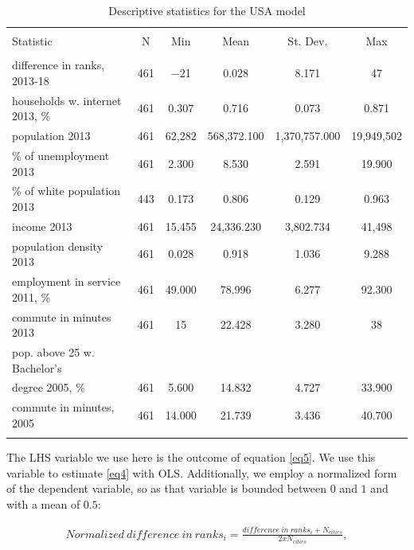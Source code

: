 \documentclass[10pt,letterpaper]{article}
\begin{document}
\begin{table}[!htbp] \centering 
  \caption{Descriptive statistics for the USA model\label{desc.usa}} 
  \label{} 
\small 
\begin{tabular}{@{\extracolsep{1pt}}lccccc} 
\\[-1.8ex]\hline 
\hline \\[-1.8ex] 
Statistic & \multicolumn{1}{c}{N} & \multicolumn{1}{c}{Min} & \multicolumn{1}{c}{Mean} & \multicolumn{1}{c}{St. Dev.} & \multicolumn{1}{c}{Max} \\ 
\hline \\[-1.8ex] 
difference in ranks, 2013-18 & 461 & $-$21 & 0.028 & 8.171 & 47 \\ 
households w. internet 2013, \% & 461 & 0.307 & 0.716 & 0.073 & 0.871 \\ 
population 2013 & 461 & 62,282 & 568,372.100 & 1,370,757.000 & 19,949,502 \\ 
\% of unemployment 2013 & 461 & 2.300 & 8.530 & 2.591 & 19.900 \\ 
\% of white population 2013 & 443 & 0.173 & 0.806 & 0.129 & 0.963 \\ 
income 2013 & 461 & 15,455 & 24,336.230 & 3,802.734 & 41,498 \\ 
population density 2013 & 461 & 0.028 & 0.918 & 1.036 & 9.288 \\ 
employment in service 2011, \% & 461 & 49.000 & 78.996 & 6.277 & 92.300 \\ 
commute in minutes 2013 & 461 & 15 & 22.428 & 3.280 & 38 \\ 
pop. above 25 w. Bachelor's \\
                             degree 2005, \% & 461 & 5.600 & 14.832 & 4.727 & 33.900 \\ 
commute in minutes, 2005 & 461 & 14.000 & 21.739 & 3.436 & 40.700 \\ 
\hline \\[-1.8ex] 
\end{tabular} 
\end{table}

The LHS variable we use here is the outcome of equation \ref{eq5}. We
use this variable to estimate \ref{eq4} with OLS. Additionally, we
employ a normalized form of the dependent variable, so as that variable
is bounded between \(0\) and \(1\) and with a mean of \(0.5\):

\begin{align}
Normalized\:difference\:in\:ranks_{i} = \frac{difference\:in\:ranks_{i} + N_{cities}}{2xN_{cities}},\label{eq6}
\end{align}
\end{document}
